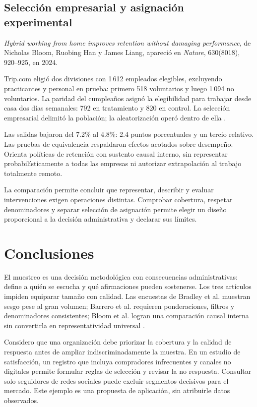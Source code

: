 {\subsection{Selección empresarial y asignación experimental}
\textit{Hybrid working from home improves retention without damaging performance}, de Nicholas Bloom, Ruobing Han y James Liang, apareció en \textit{Nature}, 630(8018), 920--925, en 2024.

Trip.com eligió dos divisiones con 1\,612 empleados elegibles, excluyendo practicantes y personal en prueba: primero 518 voluntarios y luego 1\,094 no voluntarios. La paridad del cumpleaños asignó la elegibilidad para trabajar desde casa dos días semanales: 792 en tratamiento y 820 en control. La selección empresarial delimitó la población; la aleatorización operó dentro de ella \citep{bloom2024}.

Las salidas bajaron del 7.2\% al 4.8\%: 2.4 puntos porcentuales y un tercio relativo. Las pruebas de equivalencia respaldaron efectos acotados sobre desempeño. Orienta políticas de retención con sustento causal interno, sin representar probabilísticamente a todas las empresas ni autorizar extrapolación al trabajo totalmente remoto.

La comparación permite concluir que representar, describir y evaluar intervenciones exigen operaciones distintas. Comprobar cobertura, respetar denominadores y separar selección de asignación permite elegir un diseño proporcional a la decisión administrativa y declarar sus límites.

\clearpage
\section{Conclusiones}
El muestreo es una decisión metodológica con consecuencias administrativas: define a quién se escucha y qué afirmaciones pueden sostenerse. Los tres artículos impiden equiparar tamaño con calidad. Las encuestas de Bradley et al. muestran sesgo pese al gran volumen; Barrero et al. requieren ponderaciones, filtros y denominadores consistentes; Bloom et al. logran una comparación causal interna sin convertirla en representatividad universal \citep{bradley2021,barrero2023,bloom2024}.

Considero que una organización debe priorizar la cobertura y la calidad de respuesta antes de ampliar indiscriminadamente la muestra. En un estudio de satisfacción, un registro que incluya compradores infrecuentes y canales no digitales permite formular reglas de selección y revisar la no respuesta. Consultar solo seguidores de redes sociales puede excluir segmentos decisivos para el mercado. Este ejemplo es una propuesta de aplicación, sin atribuirle datos observados.

}
